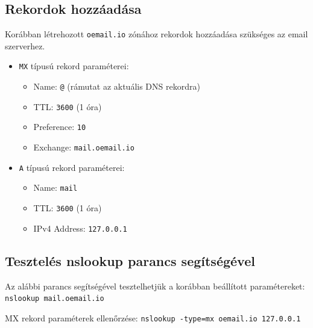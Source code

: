 \subsection{Rekordok hozzáadása}
\begin{flushleft}
    Korábban létrehozott \verb|oemail.io| zónához rekordok hozzáadása szükséges az email szerverhez.
\end{flushleft}
\begin{itemize}
    \item \verb|MX| típusú rekord paraméterei:
    \begin{itemize}
        \item Name: \verb|@| (rámutat az aktuális DNS rekordra)
        \item TTL: \verb|3600| (1 óra)
        \item Preference: \verb|10|
        \item Exchange: \verb|mail.oemail.io|
    \end{itemize}
    \item \verb|A| típusú rekord paraméterei:
    \begin{itemize}
        \item Name: \verb|mail|
        \item TTL: \verb|3600| (1 óra)
        \item IPv4 Address: \verb|127.0.0.1|
    \end{itemize}
\end{itemize}
\subsection{Tesztelés nslookup parancs segítségével}
Az alábbi parancs segítségével tesztelhetjük a korábban beállított paramétereket: \verb|nslookup mail.oemail.io|
\begin{flushleft}
    MX rekord paraméterek ellenőrzése: \verb|nslookup -type=mx oemail.io 127.0.0.1|
\end{flushleft}